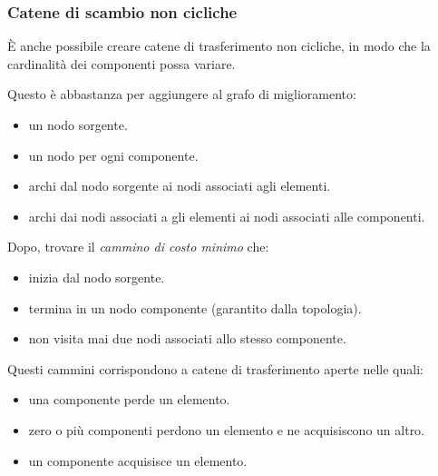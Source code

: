 \documentclass{article}
\begin{document}
\subsubsection{Catene di scambio non cicliche}
È anche possibile creare catene di trasferimento non cicliche, in
modo che la cardinalità dei componenti possa variare.

Questo è abbastanza per aggiungere al grafo di miglioramento:
\begin{itemize}
    \item un nodo sorgente.
    \item un nodo per ogni componente.
    \item archi dal nodo sorgente ai nodi associati agli elementi.
    \item archi dai nodi associati a gli elementi ai nodi associati alle componenti.
\end{itemize}

Dopo, trovare il \textit{cammino di costo minimo} che:
\begin{itemize}
    \item inizia dal nodo sorgente.
    \item termina in un nodo componente (garantito dalla topologia).
    \item non visita mai due nodi associati allo stesso componente.
\end{itemize}
Questi cammini corrispondono a catene di trasferimento aperte nelle quali:
\begin{itemize}
    \item una componente perde un elemento.
    \item zero o più componenti perdono un elemento e ne acquisiscono un altro.
    \item un componente acquisisce un elemento.
\end{itemize}
\end{document}
